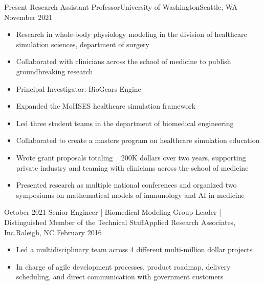 %
%
%

\begin{experiences}
  \experience
    {Present}   {Research Assistant Professor}{University of Washington}{Seattle, WA}
    {November 2021} {
                      \begin{itemize}
                        \item Research in whole-body physiology modeling in the division of healthcare simulation sciences, department of surgery
                        \item Collaborated with clinicians across the school of medicine to publish groundbreaking research
                        \item Principal Investigator: BioGears Engine
                        \item Expanded the MoHSES healthcare simulation framework
                        \item Led three student teams in the department of biomedical engineering
                        \item Collaborated to create a masters program on healthcare simulation education
                        \item Wrote grant proposals totaling ~ 200K dollars over two years, supporting private industry and teaming with clinicians across the school of medicine
                        \item Presented research as multiple national conferences and organized two symposiums on mathematical models of immunology and AI in medicine  
                      \end{itemize}
                    }
                    {}
  \emptySeparator
  \experience
    {October 2021} {Senior Engineer | Biomedical Modeling Group Leader | Distinguished Member of the Technical Staff}{Applied Research Associates, Inc.}{Raleigh, NC}
    {February 2016}    {
                      \begin{itemize}
                        \item Led a multidisciplinary team across 4 different multi-million dollar projects                           
                        \item In charge of agile development processes, product roadmap, delivery scheduling, and direct communication with government customers                        

\end{itemize}}
\end{experiences}
